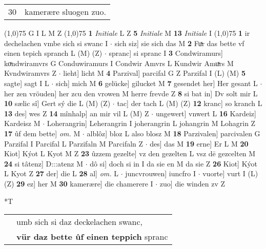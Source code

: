 \documentclass[8pt,a4paper,notitlepage]{article}
\begin{document}
\begin{table}[ht]
\begin{minipage}[t]{0.5\linewidth}
\begin{tabular}{rl}
30 & kamerære sluogen zuo.\\ 
\end{tabular}
\scriptsize
\line(1,0){75} \newline
G I L M Z \newline
\line(1,0){75} \newline
\textbf{1} \textit{Initiale} L Z  \textbf{5} \textit{Initiale} M  \textbf{13} \textit{Initiale} I  \newline
\line(1,0){75} \newline
\textbf{1} ir dechelachen vmbe sich si swanc I  $\cdot$ sich siz] sie sich das M \textbf{2} Fuͯr das bette vf einen tepich spranch L (M) (Z)  $\cdot$ spranc] si spranc I \textbf{3} Condwiramurs] koͮndwiramvrs G Conduwiramurs I Condwir Amvrs L Kundwir Amuͯrs M Kvndwiramvrs Z  $\cdot$ lieht] licht M \textbf{4} Parzival] parcifal G Z Parzifal I (L) (M) \textbf{5} sagte] sagt I L  $\cdot$ sich] mich M \textbf{6} gelücke] gilucket M \textbf{7} gesendet her] Her gesant L  $\cdot$ her zen vröuden] her zcu den vrowen M herre frevde Z \textbf{8} si bat in] Dv solt mir L \textbf{10} sælic sî] Gert sý die L (M) (Z)  $\cdot$ tac] der tach L (M) (Z) \textbf{12} kranc] so kranch L \textbf{13} des] wes Z \textbf{14} mînhalp] an mir vil L (M) Z  $\cdot$ ungewert] vnwert L \textbf{16} Kardeiz] Kardeisz M  $\cdot$ Loherangrin] Leherangrin I joherangrin L johangrin M Lohagrin Z \textbf{17} ûf dem bette] \textit{om.} M  $\cdot$ alblôz] bloz L also blosz M \textbf{18} Parzivalen] parcivalen G Parzifal I Parcifal L Parzifaln M Parcifaln Z  $\cdot$ des] das M \textbf{19} erne] Er L M \textbf{20} Kiot] Kýot L Kyot M Z \textbf{23} ûzzem gezelte] vz den gezelten L vsz dē gezcelten M \textbf{24} si tâtenz] D:::atenz M  $\cdot$ dô si] doch si in I da sie en M da sie Z \textbf{26} Kiot] Kýot L Kyot Z \textbf{27} der] die L \textbf{28} al] \textit{om.} L  $\cdot$ juncvrouwen] iuncfro I  $\cdot$ vuorte] vurt I (L) (Z) \textbf{29} ez] her M \textbf{30} kamerære] die chamerere I  $\cdot$ zuo] die winden zv Z \newline
\end{minipage}
\hspace{0.5cm}
\begin{minipage}[t]{0.5\linewidth}
\small
\begin{center}*T
\end{center}
\begin{tabular}{rl}
 & umb sich si daz deckelachen swanc,\\ 
 & \textbf{vür daz bette ûf einen teppich} spranc\\ 

\end{tabular}
\end{minipage}
\end{table}
\end{document}
